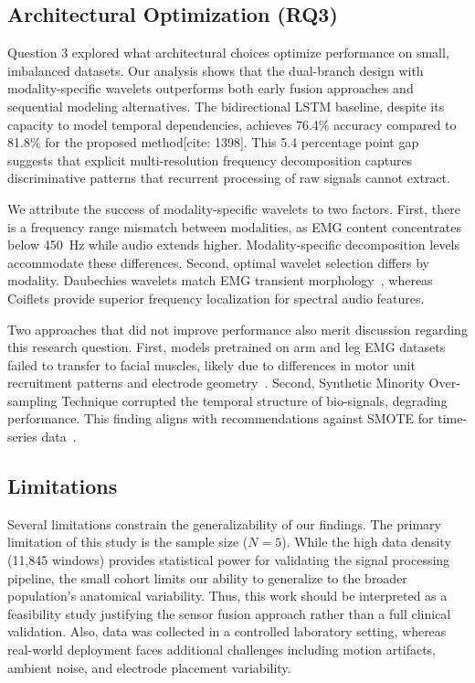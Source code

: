 \documentclass[acmtog, nonacm]{acmart}
\begin{document}
\subsection{Architectural Optimization (RQ3)}
Question 3 explored what architectural choices optimize performance on small, imbalanced datasets. Our analysis shows that the dual-branch design with modality-specific wavelets outperforms both early fusion approaches and sequential modeling alternatives. The bidirectional LSTM baseline, despite its capacity to model temporal dependencies, achieves 76.4\% accuracy compared to 81.8\% for the proposed method[cite: 1398]. This 5.4 percentage point gap suggests that explicit multi-resolution frequency decomposition captures discriminative patterns that recurrent processing of raw signals cannot extract.

We attribute the success of modality-specific wavelets to two factors. First, there is a frequency range mismatch between modalities, as EMG content concentrates below 450~Hz while audio extends higher. Modality-specific decomposition levels accommodate these differences. Second, optimal wavelet selection differs by modality. Daubechies wavelets match EMG transient morphology~\cite{englehart2003robust}, whereas Coiflets provide superior frequency localization for spectral audio features.

Two approaches that did not improve performance also merit discussion regarding this research question. First, models pretrained on arm and leg EMG datasets failed to transfer to facial muscles, likely due to differences in motor unit recruitment patterns and electrode geometry~\cite{jiang2012myoelectric}. Second, Synthetic Minority Over-sampling Technique corrupted the temporal structure of bio-signals, degrading performance. This finding aligns with recommendations against SMOTE for time-series data~\cite{johnson2019survey}.

\subsection{Limitations}
Several limitations constrain the generalizability of our findings. The primary limitation of this study is the sample size ($N=5$). While the high data density (11,845 windows) provides statistical power for validating the signal processing pipeline, the small cohort limits our ability to generalize to the broader population's anatomical variability. Thus, this work should be interpreted as a feasibility study justifying the sensor fusion approach rather than a full clinical validation. Also, data was collected in a controlled laboratory setting, whereas real-world deployment faces additional challenges including motion artifacts, ambient noise, and electrode placement variability. 
\end{document}
